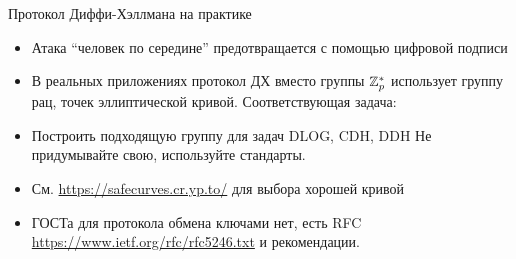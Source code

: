 \documentclass[usenames,dvipsnames,8pt,aspectratio=169]{beamer}
\begin{document}
\begin{frame}{Протокол Диффи-Хэллмана на практике}
\Large
\begin{itemize}
	\itemsep 10pt
	\item Атака ``человек по середине'' предотвращается с помощью цифровой подписи
	\item В реальных приложениях протокол ДХ вместо группы ${{\mathbb Z}}_p^*$ использует группу рац, точек эллиптической кривой. Соответствующая задача:  {\color{Orange}{EDDH.}} 
	\item Построить подходящую группу для задач DLOG, CDH, DDH {\color{Orange}{нетривиальна!}}  Не придумывайте свою, используйте стандарты.
	\item См. \url{https://safecurves.cr.yp.to/} для выбора хорошей кривой
	\item ГОСТа для протокола обмена ключами нет, есть RFC \url{https://www.ietf.org/rfc/rfc5246.txt} и рекомендации.
\end{itemize}

\end{frame}
\end{document}
